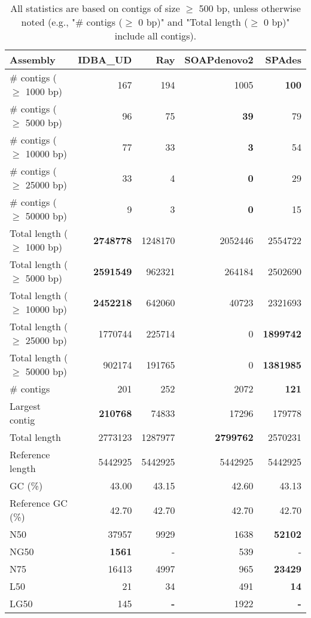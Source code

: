 \documentclass[12pt,a4paper]{article}
\begin{document}
\begin{table}[ht]
\begin{center}
\caption{All statistics are based on contigs of size $\geq$ 500 bp, unless otherwise noted (e.g., "\# contigs ($\geq$ 0 bp)" and "Total length ($\geq$ 0 bp)" include all contigs).}
\begin{tabular}{|l*{4}{|r}|}
\hline
Assembly & IDBA\_UD & Ray & SOAPdenovo2 & SPAdes \\ \hline
\# contigs ($\geq$ 1000 bp) & 167 & 194 & 1005 & {\bf 100} \\ \hline
\# contigs ($\geq$ 5000 bp) & 96 & 75 & {\bf 39} & 79 \\ \hline
\# contigs ($\geq$ 10000 bp) & 77 & 33 & {\bf 3} & 54 \\ \hline
\# contigs ($\geq$ 25000 bp) & 33 & 4 & {\bf 0} & 29 \\ \hline
\# contigs ($\geq$ 50000 bp) & 9 & 3 & {\bf 0} & 15 \\ \hline
Total length ($\geq$ 1000 bp) & {\bf 2748778} & 1248170 & 2052446 & 2554722 \\ \hline
Total length ($\geq$ 5000 bp) & {\bf 2591549} & 962321 & 264184 & 2502690 \\ \hline
Total length ($\geq$ 10000 bp) & {\bf 2452218} & 642060 & 40723 & 2321693 \\ \hline
Total length ($\geq$ 25000 bp) & 1770744 & 225714 & 0 & {\bf 1899742} \\ \hline
Total length ($\geq$ 50000 bp) & 902174 & 191765 & 0 & {\bf 1381985} \\ \hline
\# contigs & 201 & 252 & 2072 & {\bf 121} \\ \hline
Largest contig & {\bf 210768} & 74833 & 17296 & 179778 \\ \hline
Total length & 2773123 & 1287977 & {\bf 2799762} & 2570231 \\ \hline
Reference length & 5442925 & 5442925 & 5442925 & 5442925 \\ \hline
GC (\%) & 43.00 & 43.15 & 42.60 & 43.13 \\ \hline
Reference GC (\%) & 42.70 & 42.70 & 42.70 & 42.70 \\ \hline
N50 & 37957 & 9929 & 1638 & {\bf 52102} \\ \hline
NG50 & {\bf 1561} & - & 539 & - \\ \hline
N75 & 16413 & 4997 & 965 & {\bf 23429} \\ \hline
L50 & 21 & 34 & 491 & {\bf 14} \\ \hline
LG50 & 145 & {\bf -} & 1922 & {\bf -} \\ \hline

\end{tabular}
\end{center}
\end{table}
\end{document}

